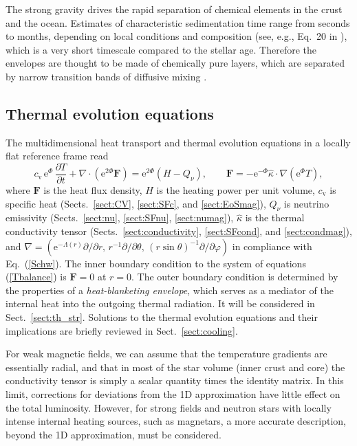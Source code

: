 \documentclass[smallextended]{svjour3}       %
\newcommand{\beq}{\begin{equation}}
\newcommand{\eeq}{\end{equation}}
\newcommand{\req}[1]{Eq.~(\ref{#1})}
\begin{document}
The strong gravity drives the rapid separation of chemical
elements in the crust and the ocean.  Estimates of
characteristic sedimentation time range from seconds to months,
depending on local conditions and composition (see, e.g., Eq.~20
in \citealp{P14}), which is a very short timescale compared to the
stellar age. Therefore the envelopes are thought to be made of chemically
pure layers, which are separated by narrow transition bands
of diffusive mixing \citep{DeBlasio00,ChangBA10}.

\subsection{Thermal evolution equations}
\label{sect:equations}

The multidimensional heat transport and thermal evolution
equations in a locally flat reference frame read
\citep[e.g.,][]{AguileraPM08,PonsMG09,vigano13}
\beq
  c_\mathrm{v}\,\mathrm{e}^\Phi\,\frac{\partial T}{\partial t}
      + \nabla\cdot(\mathrm{e}^{2\Phi} \bm{F}) = 
           \mathrm{e}^{2\Phi} (H - Q_\nu),
\qquad
  \bm{F} = - \mathrm{e}^{-\Phi}
 \hat{\kappa}\cdot\nabla(\mathrm{e}^\Phi T),
\label{Tbalance}
\eeq
where $\bm{F}$ is the heat flux density, $H$ is the heating
power per unit volume, $c_\mathrm{v}$ is specific heat
(Sects.~\ref{sect:CV}, \ref{sect:SFc}, and
\ref{sect:EoSmag}), $Q_\nu$ is neutrino emissivity
(Sects.~\ref{sect:nu}, \ref{sect:SFnu},
\ref{sect:numag}), $\hat{\kappa}$ is the thermal
conductivity tensor (Sects.~\ref{sect:conductivity},
\ref{sect:SFcond}, and \ref{sect:condmag}), and
$\nabla=
(\mathrm{e}^{-\Lambda(r)}\partial/\partial r,\,
r^{-1}\partial/\partial \theta,\,
(r\sin\theta)^{-1}\partial/\partial \varphi)$ in
compliance with \req{Schw}.
The inner boundary condition to the system of
equations (\ref{Tbalance}) is $\bm{F}=0$ at
$r=0$. The outer boundary condition is
determined by the properties of a \emph{heat-blanketing
envelope}, which serves as a mediator of the internal heat
into the outgoing thermal radiation. It will be considered in
Sect.~\ref{sect:th_str}. Solutions to the thermal
evolution equations and their implications are briefly
reviewed in Sect.~\ref{sect:cooling}.

For weak magnetic fields, we can
assume that the temperature gradients are essentially
radial, and that in most of the star volume (inner crust and
core) the conductivity tensor is simply a scalar quantity
times the identity matrix. In this limit, corrections for
deviations  from the 1D approximation have little effect on
the total luminosity. However, for strong fields and neutron
stars with locally intense internal heating sources, such as
magnetars,  a more accurate description, beyond the 1D
approximation, must be considered. 
\end{document}
